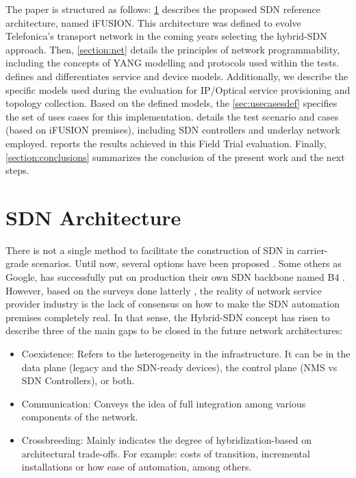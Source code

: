 \documentclass[a4paper,fleqn]{cas-dc}
\begin{document}
The paper is structured as follows: \cref{section:arq} describes the proposed SDN reference architecture, named iFUSION. This architecture was defined to evolve Telefonica's transport network in the coming years selecting the hybrid-SDN approach. Then, \cref{section:net} details the principles of network programmability, including the concepts of YANG modelling and protocols used within the tests.  defines and differentiates service and device models. Additionally, we describe the specific models used during the evaluation for IP/Optical service provisioning and topology collection. Based on the defined models, the \cref{sec:usecasesdef} specifies the set of uses cases for this implementation.  details the test scenario and cases (based on iFUSION premises), including SDN controllers and underlay network employed.  reports the results achieved in this Field Trial evaluation. Finally, \cref{section:conclusions} summarizes the conclusion of the present work and the next steps.

\section{SDN Architecture}
\label{section:arq}

There is not a single method to facilitate the construction of SDN in carrier-grade scenarios. Until now, several options have been proposed \cite{bakshi2013considerations,karakus2017survey,birk2016evolving}. Some others as Google, has successfully put on production their own SDN backbone named B4 \cite{jain2013b4}. However, based on the surveys done latterly \cite{campbell1999survey,sinha2017survey,boucadair2014software}, the reality of network service provider industry is the lack of consensus on how to make the SDN automation premises completely real. In that sense, the Hybrid-SDN concept has risen to describe three of the main gaps to be closed in the future network architectures:
\begin{itemize}
    \item Coexistence: Refers to the heterogeneity in the infrastructure. It can be in the data plane (legacy and the SDN-ready devices), the control plane (NMS vs SDN Controllers), or both. 
    \item Communication: Conveys the idea of full integration among various components of the network.
    \item Crossbreeding: Mainly indicates the degree of hybridization-based on architectural trade-offs. For example: costs of transition, incremental installations or how ease of automation, among others. 
\end{itemize}
\end{document}
